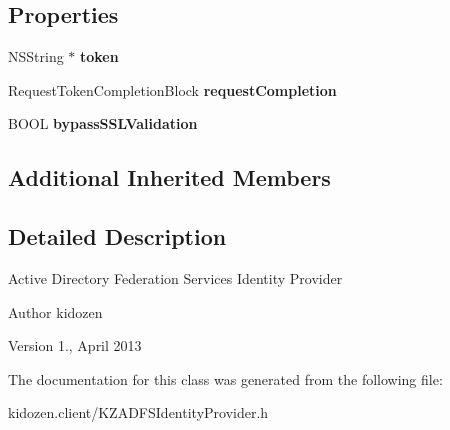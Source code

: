 \subsection*{Properties}
\begin{DoxyCompactItemize}
\item 
\hypertarget{interface_k_z_a_d_f_s_identity_provider_af66559dc473132f87f741ba220e17208}{N\-S\-String $\ast$ {\bfseries token}}\label{interface_k_z_a_d_f_s_identity_provider_af66559dc473132f87f741ba220e17208}

\item 
\hypertarget{interface_k_z_a_d_f_s_identity_provider_a46dd0f89823f2ed64b0be7f8414dd4e5}{Request\-Token\-Completion\-Block {\bfseries request\-Completion}}\label{interface_k_z_a_d_f_s_identity_provider_a46dd0f89823f2ed64b0be7f8414dd4e5}

\item 
\hypertarget{interface_k_z_a_d_f_s_identity_provider_ac64384a14fd756c23afc3fed097b254f}{B\-O\-O\-L {\bfseries bypass\-S\-S\-L\-Validation}}\label{interface_k_z_a_d_f_s_identity_provider_ac64384a14fd756c23afc3fed097b254f}

\end{DoxyCompactItemize}
\subsection*{Additional Inherited Members}


\subsection{Detailed Description}
Active Directory Federation Services Identity Provider

\begin{DoxyAuthor}{Author}
kidozen 
\end{DoxyAuthor}
\begin{DoxyVersion}{Version}
1., April 2013 
\end{DoxyVersion}


The documentation for this class was generated from the following file\-:\begin{DoxyCompactItemize}
\item 
kidozen.\-client/K\-Z\-A\-D\-F\-S\-Identity\-Provider.\-h\end{DoxyCompactItemize}
